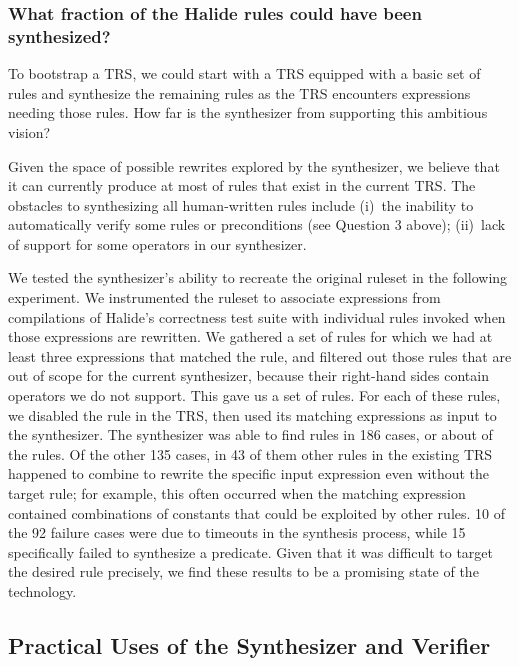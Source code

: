 \documentclass[acmsmall,review]{acmart}\settopmatter{printfolios=true,printccs=false,printacmref=false}
\begin{document}
\subsubsection{What fraction of the Halide rules could have been synthesized?}
\label{sub:replacementexperiment}
To bootstrap a TRS, we could start with a TRS equipped with a basic set of rules and synthesize the remaining rules as the TRS encounters expressions needing those rules.  How far is the synthesizer from supporting this ambitious vision?

Given the space of possible rewrites explored by the synthesizer, we believe that it can currently produce at most \PercentPossibleToSynth{} of rules that exist in the current TRS. The obstacles to synthesizing all human-written rules include (i)~the inability to automatically verify some rules or preconditions (see Question 3 above); (ii)~lack of support for some operators in our synthesizer. 

We tested the synthesizer's ability to recreate the original ruleset in the following experiment. We instrumented the ruleset to associate expressions from compilations of Halide's correctness test suite with individual rules invoked when those expressions are rewritten. We gathered a set of rules for which we had at least three expressions that matched the rule, and filtered out those rules that are out of scope for the current synthesizer, because their right-hand sides contain operators we do not support. This gave us a set of \NumRulesInCorrectnessExperiment{} rules. For each of these rules, we disabled the rule in the TRS, then used its matching expressions as input to the synthesizer. The synthesizer was able to find rules in 186 cases, or about \PercentRulesResynthesized{} of the rules. Of the other 135 cases, in 43 of them other rules in the existing TRS happened to combine to rewrite the specific input expression even without the target rule; for example, this often occurred when the matching expression contained combinations of constants that could be exploited by other rules. 10 of the 92 failure cases were due to timeouts in the synthesis process, while 15 specifically failed to synthesize a predicate. Given that it was difficult to target the desired rule precisely, we find these results to be a promising state of the technology.


\subsection{Practical Uses of the Synthesizer and Verifier}
\end{document}
